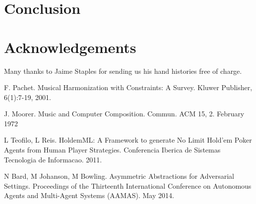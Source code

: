 \documentclass[twoside]{article}
\begin{document}
\begin{multicols}{2}

\section{Conclusion}


\section{Acknowledgements}

Many thanks to Jaime Staples for sending us his hand histories free of charge. 


\begin{thebibliography}{99} %
 F. Pachet. Musical Harmonization with Constraints: A Survey. Kluwer Publisher, 6(1):7-19, 2001.

 J. Moorer. Music and Computer Composition. Commun. ACM 15, 2. February 1972

 L Teofilo, L Reis. HoldemML: A Framework to generate No Limit Hold’em Poker Agents from Human Player Strategies. Conferencia Iberica de Sistemas Tecnologia de Informacao. 2011.

 N Bard, M Johanson, M Bowling. Asymmetric Abstractions for Adversarial Settings. Proceedings of the Thirteenth International Conference on Autonomous Agents and Multi-Agent Systems (AAMAS). May 2014.
\end{thebibliography}


\end{multicols}
\end{document}
